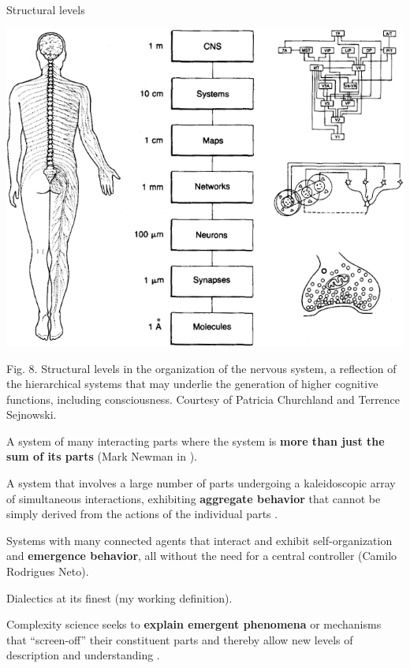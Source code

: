 \documentclass[
12pt,
openright,
oneside,
a4paper,
chapter=TITLE,
section=TITLE,
french,
spanish,
brazil,
english
]{abntex2}\usepackage{array}
\begin{document}
Structural levels

\includegraphics{qmd/images/lewin-1993-figure-8.png}

Fig. 8. Structural levels in the organization of the nervous system, a
reflection of the hierarchical systems that may underlie the generation
of higher cognitive functions, including consciousness. Courtesy of
Patricia Churchland and Terrence Sejnowski.

A system of many interacting parts where the system is \textbf{more than
just the sum of its parts} (Mark Newman in \textcite{mitchell2013}).

A system that involves a large number of parts undergoing a
kaleidoscopic array of simultaneous interactions, exhibiting
\textbf{aggregate behavior} that cannot be simply derived from the
actions of the individual parts \autocite{holland1992b}.

Systems with many connected agents that interact and exhibit
self-organization and \textbf{emergence behavior}, all without the need
for a central controller (Camilo Rodrigues Neto).

Dialectics at its finest (my working definition).

Complexity science seeks to \textbf{explain emergent phenomena} or
mechanisms that ``screen-off'' their constituent parts and thereby allow
new levels of description and understanding \autocite{krakauer2024}.
\end{document}
